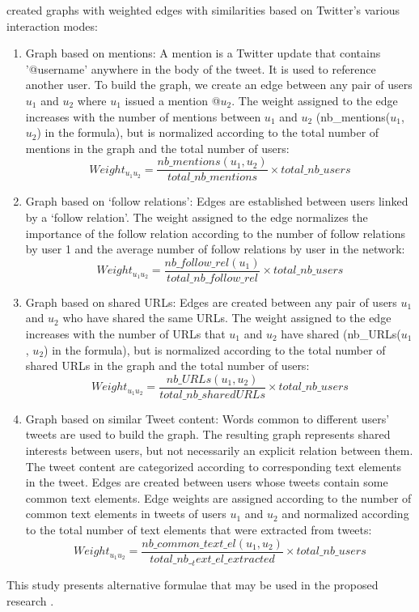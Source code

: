  created graphs with weighted edges with similarities based on Twitter's various interaction modes:
\begin {enumerate}
\item Graph based on mentions: A mention is a Twitter update that contains '@username' anywhere in the body of the tweet. It is used to reference another user. To build the graph, we create an edge between any pair of users $u_1$ and $u_2$ where $u_1$ issued a mention @$u_2$. The weight assigned to the edge increases with the number of mentions between $u_1$ and $u_2$ (nb\_mentions($u_1$, $u_2$) in the formula), but is normalized according to the total number of mentions in the graph and the total number of users:
\begin{equation}
Weight_{u_1 u_2} = \frac{nb\_mentions(u_1, u_2)}{total\_nb\_mentions} \times total\_nb\_users
\end{equation}
\item Graph based on ‘follow relations’: Edges are established between users linked by a ‘follow relation’. The weight assigned to the edge normalizes the importance of the follow relation according to the number of follow relations by user 1 and the average number of follow relations by user in the network:
\begin{equation}
Weight_{u_1 u_2} = \frac{nb\_follow\_rel(u_1)}{total\_nb\_follow\_rel} \times total\_nb\_users
\end{equation}
\item Graph based on shared URLs: Edges are created between any pair of users $u_1$ and $u_2$ who have shared the same URLs. The weight assigned to the edge increases with the number of URLs that $u_1$ and $u_2$ have shared (nb\_URLs($u_1$, $u_2$) in the formula), but is normalized according to the total number of shared URLs in the graph and the total number of users:
\begin{equation}
Weight_{u_1 u_2} = \frac{nb\_URLs(u_1, u_2)}{total\_nb\_sharedURLs} \times total\_nb\_users
\end{equation}
\item Graph based on similar Tweet content: Words common to different users’ tweets are used to build the graph. The resulting graph represents shared interests between users, but not necessarily an explicit relation between them. The tweet content are categorized according to corresponding text elements in the tweet. Edges are created between users whose tweets contain some common text elements. Edge weights are assigned according to the number of common text elements in tweets of users $u_1$ and $u_2$ and normalized according to the total number of text elements that were extracted from tweets:
\begin{equation}
Weight_{u_1 u_2} = \frac{nb\_common\_text\_el(u_1, u_2)}{total\_nb\__text\_el\_extracted} \times total\_nb\_users
\end{equation}

\end {enumerate}
This study presents alternative formulae that may be used in the proposed research \cite{Bakillah:2014}.

